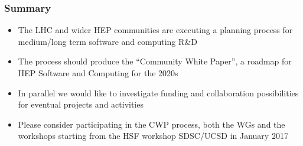 \begin{frame}
\frametitle{Summary}

\begin{itemize}
\item The LHC and wider HEP communities are executing a planning process for medium/long term software and computing R\&D
\item The process should produce the ``Community White Paper'', a roadmap for HEP Software and Computing for the 2020s
\item In parallel we would like to investigate funding and collaboration possibilities for eventual projects and activities
\item Please consider participating in the CWP process, both the WGs and the workshops starting from the HSF workshop SDSC/UCSD in January 2017
\end{itemize}



\end{frame}


